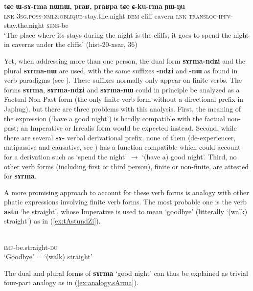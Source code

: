 \documentclass[11pt]{article}
\newcommand{\ipa}[1]{{\phon\textbf{#1}}}
\newcommand{\refb}[1]{(\ref{#1})}
\begin{document}
\begin{exe}
\ex \label{ex:Ckurma}
\gll 
\ipa{tɕe}	\ipa{ɯ-sɤ-rma}	\ipa{nɯnɯ,}	\ipa{praʁ,}	\ipa{praʁpa}	\ipa{tɕe}	\ipa{ɕ-ku-rma}	\ipa{ɲɯ-ŋu} \\
\textsc{lnk} \textsc{3sg.poss-nmlz:oblique}-stay.the.night \textsc{dem} cliff cavern \textsc{lnk} \textsc{transloc-ipfv}-stay.the.night \textsc{sens}-be \\
\glt `The place where its stays during the night is the cliffs, it goes to spend the night in caverns under the cliffs.' (hist-20-xsar, 36)
\end{exe}

Yet, when addressing more than one person, the dual form  \ipa{sɤrma-ndʑi} and the plural  \ipa{sɤrma-nɯ} are used, with the same suffixes \ipa{-ndʑi} and \ipa{-nɯ} as found in verb paradigms (see \citealt{jacques17sketch}). These suffixes normally only appear on finite verbs. The forms \ipa{sɤrma}, \ipa{sɤrma-ndʑi} and \ipa{sɤrma-nɯ} could in principle be analyzed as a Factual Non-Past form (the only finite verb form without a directional prefix in Japhug), but there are three problems with this analysis. First, the meaning of the expression (`have a good night') is hardly compatible with the factual non-past; an Imperative or Irrealis form would be expected instead. Second, while there are several \ipa{sɤ-} verbal derivational prefix, none of them (de-experiencer, antipassive and causative, see \citealt{jacques14antipassive}) has a function compatible which could account for a derivation such as `spend the night' $\rightarrow$ `(have a) good night'.
Third, no other verb forms (including first or third person), finite or non-finite, are attested for \ipa{sɤrma}. 

A more promising approach to account for these verb forms is analogy with other phatic expressions involving finite verb forms. The most probable one is the verb \ipa{astu} `be straight', whose Imperative is used to mean `goodbye' (litterally `(walk) straight') as in \refb{ex:tAstundZi}.

\begin{exe}
\ex \label{ex:tAstundZi}
\gll \ipa{tɤ-ɤstu-ndʑi} \\
\textsc{imp}-be.straight-\textsc{du} \\
\glt `Goodbye' = `(walk) straight'
\end{exe}

The dual and plural forms of \ipa{sɤrma} `good night' can thus be explained as trivial four-part analogy as in \refb{ex:analogy.sArma}.
\end{document}
